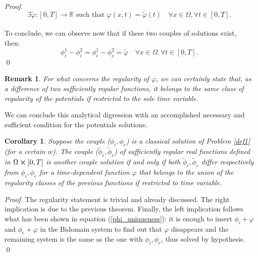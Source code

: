 \documentclass[a4paper,11pt]{article}
\newtheorem*{remark}{Remark}
\newtheorem{corollary}{Corollary}
\begin{document}
\begin{proof}
	\begin{equation*}
	\exists \tilde{\varphi}:[0,T]\rightarrow \mathbb{R} \text{ such that } \varphi(x,t) = \tilde{\varphi}(t) \quad \forall x \in \Omega,\forall t \in [0,T].
	\end{equation*}\\
	To conclude, we can observe now that if these two couples of solutions exist, then:
	\begin{equation*}
	\phi_i^1-\phi_i^2 = \phi_e^1-\phi_e^2=\tilde{\varphi} \quad \forall x \in \Omega, \forall t \in [0,T].
	\end{equation*} \qed
\end{proof}

\begin{remark}
For what concerns the regularity of $\varphi$, we can certainly state that, as a difference of two sufficiently regular functions, it belongs to the same class of regularity of the potentials if restricted to the sole time variable.
\end{remark}

\vspace{4mm}
\noindent We can conclude this analytical digression with an accomplished necessary and sufficient condition for the potentials solutions. \vspace{4mm}

\begin{corollary}
Suppose the couple ($\phi_i,\phi_e$) is a classical solution of Problem \ref{def1} (for a certain $w$). The couple ($\tilde{\phi}_i,\tilde{\phi}_e$) of sufficiently regular real functions defined in $\Omega\cross[0,T]$ is another couple solution if and only if both $\tilde{\phi}_i,\tilde{\phi}_e$ differ respectively from $\phi_i,\phi_e$ for a time-dependent function $\varphi$ that belongs to the union of the regularity classes of the previous functions if restricted to time variable.
\end{corollary}

\begin{proof}
	The regularity statement is trivial and already discussed. The right implication is due to the previous theorem. Finally, the left implication follows what has been shown in equation (\ref{phi_uniqueness}): it is enough to insert $\phi_i+\varphi$ and $\phi_e+\varphi$ in the Bidomain system to find out that $\varphi$ disappears and the remaining system is the same as the one with $\phi_i,\phi_e$, thus solved by hypothesis. \qed
\end{proof}
\end{document}
